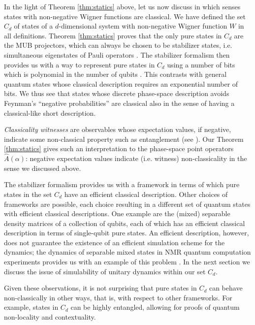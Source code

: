 \documentclass[aps,twocolumn,showpacs,nofootinbib,superscriptaddress]{revtex4}
\begin{document}
In the light of Theorem \ref{thm:statics} above, let us now discuss in which
senses states with non-negative Wigner functions are classical. We have defined
the set $C_d$ of states of a $d$-dimensional system with non-negative Wigner
function $W$ in all definitions. Theorem \ref{thm:statics} proves that the only
pure states in $C_d$ are the MUB projectors, which can always be chosen to be
stabilizer states, i.e. simultaneous eigenstates of Pauli operators
\cite{LawrenceBZ02, BandyopadhyayBRV02, PittengerR04}. The stabilizer formalism then provides us
with a way to represent pure states in $C_d$ using a number of bits which is
polynomial in the number of qubits \cite{NielsenC00}. This contrasts with general quantum states
whose classical description requires an exponential number of bits. We thus see
that states whose discrete phase-space description avoids Feynman's ``negative
probabilities'' \cite{Feynman87} are classical also in the sense of having a
classical-like short description.

\textit{Classicality witnesses} are observables whose expectation values, if negative, indicate some non-classical property such as entanglement (see \cite{Terhal02,KorbiczCWL05}). Our Theorem \ref{thm:statics} gives such an interpretation to the phase-space point operators $\hat{A}(\alpha)$: negative expectation values indicate (i.e. witness) non-classicality in the sense we discussed above.

The stabilizer formalism provides us with a framework in terms of which pure
states in the set $C_d$ have an efficient classical description. Other choices
of frameworks are possible, each choice resulting in a different set of quantum
states with efficient classical descriptions. One example are the (mixed)
separable density matrices of a collection of qubits, each of which has an
efficient classical description in terms of single-qubit pure states. An efficient
description, however, does not guarantee the existence of an efficient simulation
scheme for the dynamics; the dynamics of separable mixed states in NMR quantum
computation experiments provides us with an example of this problem
\cite{MenicucciC02}. In the next section we discuss the issue of simulability
of unitary dynamics within our set $C_d$.

Given these observations, it is not surprising that pure states in $C_d$ can
behave non-classically in other ways, that is, with respect to other frameworks.
For example, states in $C_d$ can be highly entangled, allowing for proofs of
quantum non-locality and contextuality.
\end{document}
